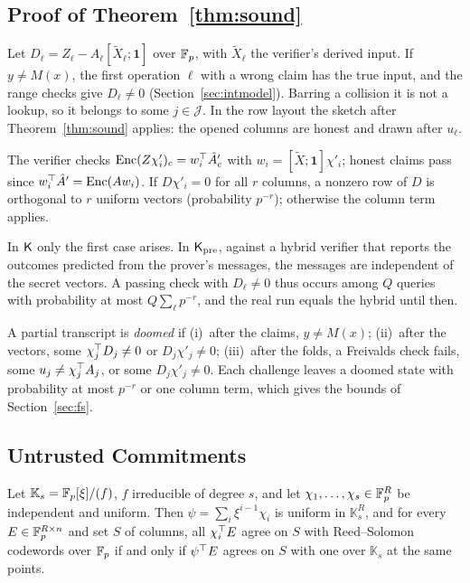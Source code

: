 \subsection{Proof of Theorem~\ref{thm:sound}}
\label{app:sound}

Let $D_\ell=Z_\ell-A_\ell[\tilde X_\ell;\mathbf 1]$ over $\mathbb{F}_p$, with $\tilde X_\ell$ the verifier's
derived input. If $y\neq M(x)$, the first operation $\ell$ with a wrong claim has the true
input, and the range checks give $D_\ell\neq0$ (Section~\ref{sec:intmodel}). Barring a collision it
is not a lookup, so it belongs to some $j\in\mathcal J$. In the row layout the sketch after
Theorem~\ref{thm:sound} applies: the opened columns are honest and drawn after $u_\ell$.

 The verifier checks $\mathrm{Enc}(Z\chi'_i)_c=w_i^\top\hat A'_c$ with
$w_i=[\tilde X;\mathbf 1]\chi'_i$; honest claims pass since $w_i^\top\hat A'=\mathrm{Enc}(Aw_i)$. If
$D\chi'_i=0$ for all $r$ columns, a nonzero row of $D$ is orthogonal to $r$ uniform vectors
(probability $p^{-r}$); otherwise the column term applies.

 In $\mathsf{K}$ only the first case arises. In $\mathsf{K}_{\mathrm{pre}}$, against a hybrid
verifier that reports the outcomes predicted from the prover's messages, the
messages are independent of the secret vectors. A passing check with $D_\ell\neq0$ thus occurs
among $Q$ queries with probability at most $Q\sum_\ell p^{-r}$, and the real run equals the hybrid
until then.

 A partial transcript is \emph{doomed} if (i)~after the claims,
$y\neq M(x)$; (ii)~after the vectors, some $\chi_j^\top D_j\neq0$ or $D_j\chi'_j\neq0$; (iii)~after
the folds, a Freivalds check fails, some $u_j\neq\chi_j^\top A_j$, or some $D_j\chi'_j\neq0$. Each
challenge leaves a doomed state with probability at most $p^{-r}$ or one column term, which gives
the bounds of Section~\ref{sec:fs}.

\subsection{Untrusted Commitments}
\label{app:untrusted}

\begin{fact}
\label{fact:ext}
Let $\mathbb K_s=\mathbb{F}_p[\xi]/(f)$, $f$ irreducible of degree $s$, and let $\chi_1,\dots,\chi_s\in\mathbb{F}_p^R$ be
independent and uniform. Then $\psi=\sum_i\xi^{i-1}\chi_i$ is uniform in $\mathbb K_s^R$, and for every
$E\in\mathbb{F}_p^{R\times n}$ and set $S$ of columns, all $\chi_i^\top E$ agree on $S$ with Reed--Solomon
codewords over $\mathbb{F}_p$ if and only if $\psi^\top E$ agrees on $S$ with one over $\mathbb K_s$ at the same
points.
\end{fact}

